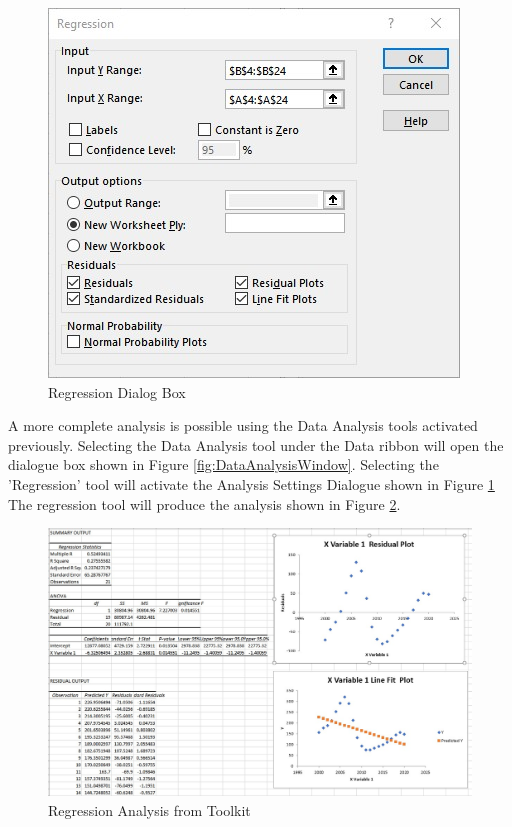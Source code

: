 \begin{figure}
	\centering
	\includegraphics[width=0.8\linewidth]{./img/AnalysisSettings.jpg}
	\caption{Regression Dialog Box}
	\label{fig:AnalysisSettings}
\end{figure}


A more complete analysis is possible using the Data Analysis tools activated previously. Selecting the Data Analysis tool under the Data ribbon will open the dialogue box shown in Figure \ref{fig:DataAnalysisWindow}.  Selecting the 'Regression' tool will activate the Analysis Settings Dialogue shown in Figure \ref{fig:AnalysisSettings} \\

The regression tool will produce the analysis shown in Figure \ref{fig:Excel2}.  


\begin{figure}
	\centering
	\includegraphics[width=1.0\linewidth]{./img/Excel2.jpg}
	\caption{Regression Analysis from Toolkit}
	\label{fig:Excel2}
\end{figure}

